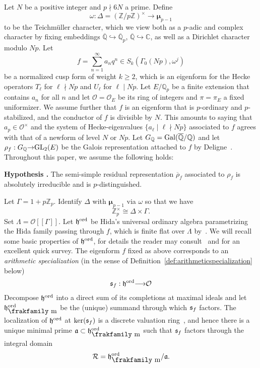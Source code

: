 \documentclass[12pt]{amsart}
\numberwithin{equation}{section}
\newenvironment{hypo}{\par\medskip\noindent\refstepcounter{thm}
\bgroup{\hspace*{-0.15 cm}\bf{Hypothesis}
\thethm.}\bgroup}{\egroup \egroup\par\medskip}
\begin{document}
 Let $N$ be a positive integer and $p \nmid 6N$ a
prime. Define
$$\omega: \Delta=({\mathbb{Z}}/p{\mathbb{Z}})^\times {\longrightarrow} \pmb{\mu}_{p-1}$$
to be the Teichm\"uller character, which we view both as a $p$-adic
and complex character by fixing embeddings $\overline{\mathbb{Q}}
\hookrightarrow \overline{\mathbb{Q}}_p$, $\overline{\mathbb{Q}} \hookrightarrow
\mathbb{C}$, as well as a Dirichlet character modulo $Np$. Let
$$f=\sum_{n=1}^{\infty} a_nq^n \in S_k(\Gamma_0(Np),{\omega}^j)$$
be a normalized cusp form of weight $k \geq 2$, which is an
eigenform for the Hecke operators $T_\ell$ for $\ell\nmid Np$ and
$U_\ell$ for $\ell \mid Np$. Let $E/{\mathbb{Q}}_p$ be a finite extension
that contains $a_n$ for all $n$ and let ${\mathcal{O}}={\mathcal{O}}_E$ be its ring of integers and $\pi=\pi_E$ a fixed uniformizer. We assume further that $f$ is an eigenform that is
$p$-ordinary and $p$-stabilized, and the conductor of $f$ is
divisible by $N$. This amounts to saying that $a_p \in {\mathcal{O}}^\times$
and the system of Hecke-eigenvalues $\{a_\ell \mid \ell \nmid Np\}$
associated to $f$ agrees with that of a newform of level $N$ or
$Np$. Let $G_{\mathbb{Q}}=\textup{Gal}(\overline{\mathbb{Q}}/{\mathbb{Q}})$ and let
$\rho_f: G_{\mathbb{Q}} {\rightarrow} \textup{GL}_2(E)$ be the Galois representation
attached to $f$ by Deligne~\cite{deligne69}.  Throughout this paper,
we assume the following holds:
\begin{hypo}
\label{hypo1} The semi-simple residual representation
$\overline{\rho}_f$ associated to $\rho_f$ is absolutely
irreducible and is $p$-distinguished.
\end{hypo}
Let $\Gamma=1+p{\mathbb{Z}}_p$. Identify $\Delta$ with $\pmb{\mu}_{p-1}$ via $\omega$ so that we have
$${\mathbb{Z}}_p^\times\cong \Delta\times\Gamma.$$
Set ${\Lambda}={\mathcal{O}}[[\Gamma]]$. Let $\frak{h}^{\textup{ord}}$ be Hida's
universal ordinary algebra parametrizing the Hida family passing through
$f$, which is finite flat over ${\Lambda}$ by~\cite[Theorem
1.1]{hidainv86}. We will recall some basic properties of
$\frak{h}^{\textup{ord}}$, for details the reader may
consult~\cite{hidainv86, hidaens86} and \cite{emertonpollackweston}
for an excellent quick survey. The eigenform $f$ fixed as above
corresponds to an \emph{arithmetic specialization} (in the sense of
Definition~\ref{def:arithmeticspecialization} below)
$$\frak{s}_f: \frak{h}^{\textup{ord}}{\longrightarrow} {\mathcal{O}}$$
Decompose $\frak{h}^{\textup{ord}}$ into a direct sum of its
completions at maximal ideals and let
$\frak{h}^{\textup{ord}}_{\hbox{\frakfamily m}}$ be the (unique) summand through
which $\frak{s}_f$ factors. The localization of
$\frak{h}^{\textup{ord}}$ at $\ker(\frak{s}_f)$ is a discrete
valuation ring~\cite[\S12.7.5]{nek}, and hence there is a unique
minimal prime $\frak{a} \subset \frak{h}^{\textup{ord}}_{\hbox{\frakfamily m}}$ such
that $\frak{s}_f$ factors through the integral domain \begin{equation}
\label{eqn:defR} \mathcal{R}=\frak{h}^{\textup{ord}}_{\hbox{\frakfamily m}}/\frak{a}.
\end{equation}
\end{document}
